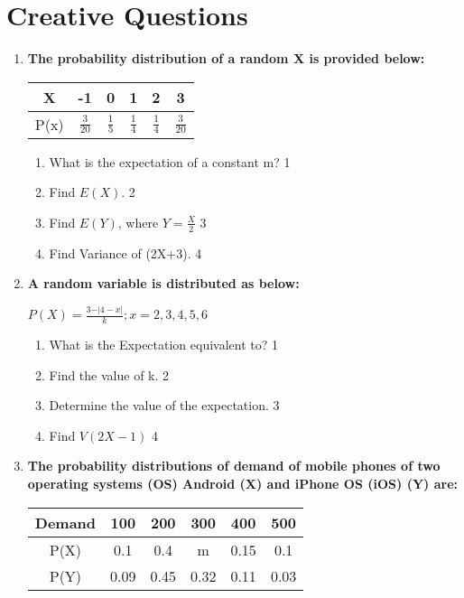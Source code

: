 \documentclass[a4paper,oneside, margin=1.4in]{book}
\begin{document}
\section{Creative Questions}
  \begin{enumerate}
  
   \item
	  \textbf{The probability distribution of a random X is provided below:} 
	  
	  \begin{table}[h]
	  \centering
\begin{tabular}{c|ccccc}
X & -1 & 0 & 1 & 2 & 3 \\ \hline
P(x) & $\frac 3{20}$ & $\frac 15$ & $\frac 14$ & $\frac 14$ & $\frac 3{20}$
\end{tabular}
\end{table}
  
  \begin{enumerate}
    \item
	What is the expectation of a constant m? \hfill 1
    \item
	Find $E(X).$ \hfill 2
    \item  
	Find $E(Y)$, where $Y = \frac X2$  \hfill 3
    \item
	Find Variance of (2X+3). \hfill 4
  \end{enumerate}
  
        \item \textbf{A random variable is distributed as below:}
        
        \begin{center}
  \textbf{$P(X) = \frac{3-\vert 4-x\vert}{k}; x=2,3,4,5,6$}
  \end{center}

  \begin{enumerate}
    \item
	What is the Expectation equivalent to? \hfill 1
    \item
    	Find the value of k. \hfill 2
    \item
    	Determine the value of the expectation. \hfill 3
     \item
     	Find $V(2X-1)$ \hfill 4
  \end{enumerate}
  
   \item
	  \textbf{The probability distributions of demand of mobile phones of two operating systems (OS) Android (X) and iPhone OS (iOS) (Y) are:} 
	  
	    \begin{table}[h]
	    	  \begin{center}
\begin{tabular}{c|c|c|c|c|c}
Demand & 100  & 200  & 300  & 400  & 500  \\ \hline
P(X)   & 0.1  & 0.4  & m    & 0.15 & 0.1  \\ \hline
P(Y)   & 0.09 & 0.45 & 0.32 & 0.11 & 0.03
\end{tabular}
	  \end{center}
\end{table}
  

\end{enumerate}
\end{document}
